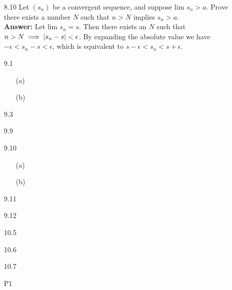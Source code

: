 \documentclass{article}
\begin{document}
\begin{itemize}
    \item [8.10] Let $(s_n)$ be a convergent sequence, and suppose lim $s_n>a$. Prove there exists a number $N$ such that $n>N$ implies $s_n>a$.\\
    \textbf{Answer: } Let lim $s_n=s$. Then there exists an $N$ such that $n>N\implies\abs{s_n-s}<\epsilon$. By expanding the absolute value we have $-\epsilon<s_n-s<\epsilon$, which is equivalent to $s-\epsilon<s_n<s+\epsilon$.
    \item [9.1]
          \begin{itemize}
              \item [(a)]
              \item [(b)]
          \end{itemize}
    \item [9.3]
    \item [9.9]
    \item [9.10]
          \begin{itemize}
              \item [(a)]
              \item [(b)]
          \end{itemize}
    \item [9.11]
    \item [9.12]
    \item [10.5]
    \item [10.6]
    \item [10.7]
    \item [P1]
\end{itemize}
\end{document}
